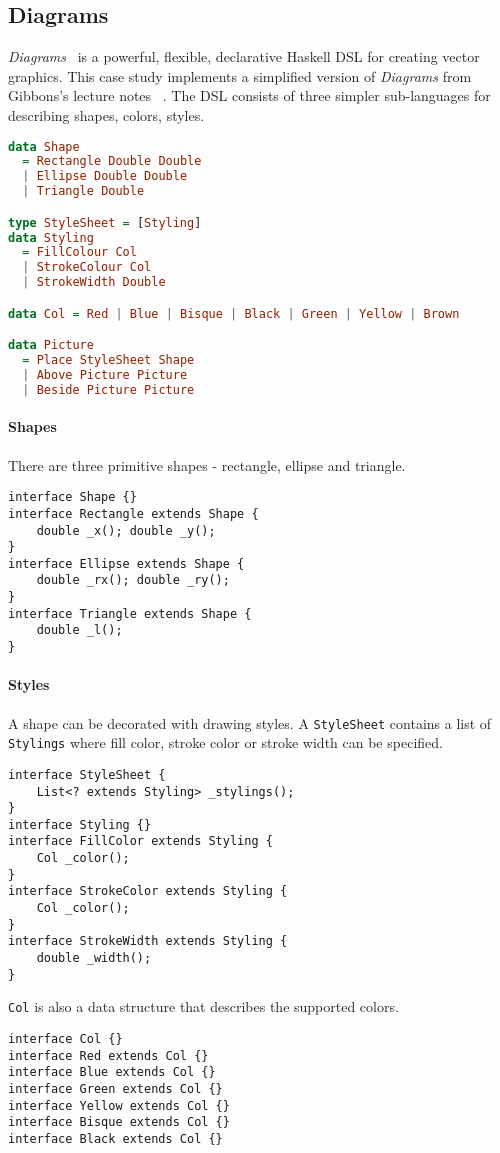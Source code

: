 \subsection{Diagrams}
\emph{Diagrams}~\cite{} is a powerful, flexible, declarative Haskell DSL for creating vector graphics.
This case study implements a simplified version of \emph{Diagrams} from
Gibbons's lecture notes ~\cite{}.
The DSL consists of three simpler sub-languages for describing shapes, colors, styles.
\begin{lstlisting}[language=haskell]
data Shape
  = Rectangle Double Double
  | Ellipse Double Double
  | Triangle Double

type StyleSheet = [Styling]
data Styling
  = FillColour Col
  | StrokeColour Col
  | StrokeWidth Double

data Col = Red | Blue | Bisque | Black | Green | Yellow | Brown

data Picture
  = Place StyleSheet Shape
  | Above Picture Picture
  | Beside Picture Picture
\end{lstlisting}

\paragraph{Shapes}
There are three primitive shapes - rectangle, ellipse and triangle.

\begin{lstlisting}
interface Shape {}
interface Rectangle extends Shape {
    double _x(); double _y();
}
interface Ellipse extends Shape {
    double _rx(); double _ry();
}
interface Triangle extends Shape {
    double _l();
}
\end{lstlisting}

\paragraph{Styles}
A shape can be decorated with drawing styles. A \texttt{StyleSheet} contains a
list of \texttt{Stylings} where fill color, stroke color or stroke width can be specified.
\begin{lstlisting}
interface StyleSheet {
    List<? extends Styling> _stylings();
}
interface Styling {}
interface FillColor extends Styling {
    Col _color();
}
interface StrokeColor extends Styling {
    Col _color();
}
interface StrokeWidth extends Styling {
    double _width();
}
\end{lstlisting}
\texttt{Col} is also a data structure that describes the supported colors.
\begin{lstlisting}
interface Col {}
interface Red extends Col {}
interface Blue extends Col {}
interface Green extends Col {}
interface Yellow extends Col {}
interface Bisque extends Col {}
interface Black extends Col {}
\end{lstlisting}

